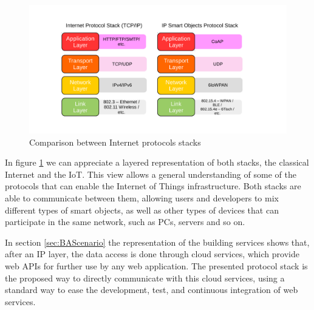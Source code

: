 \begin{figure}[htb]
	\centering
	\includegraphics[width=1\columnwidth]{chapters/background.images/Layers.pdf}
	\caption{Comparison between Internet protocols stacks}
	\label{fig:IPLayers}
\end{figure}

In figure \ref{fig:IPLayers} we can appreciate a layered representation of both stacks, the classical Internet and the IoT.
This view allows a general understanding of some of the protocols that can enable the Internet of Things infrastructure.
Both stacks are able to communicate between them, allowing users and developers to mix different types of smart objects, as well as other types of devices that can participate in the same network, such as PCs, servers and so on.

In section \ref{sec:BAScenario} the representation of the building services shows that, after an IP layer, the data access is done through cloud services, which provide web APIs for further use by any web application.
The presented protocol stack is the proposed way to directly communicate with this cloud services, using a standard way to ease the development, test, and continuous integration of web services.




